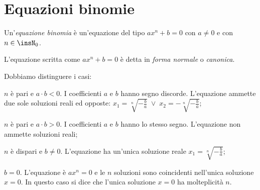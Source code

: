 \ovalbox{\risolvii \ref{ese:5.1}, \ref{ese:5.2}, \ref{ese:5.3}, \ref{ese:5.4}, \ref{ese:5.5}, \ref{ese:5.6}, \ref{ese:5.7}, \ref{ese:5.8}, \ref{ese:5.9}, \ref{ese:5.10}, \ref{ese:5.11}}

\section{Equazioni binomie}

\begin{definizione}
Un'\emph{equazione binomia} è un'equazione del tipo $ax^n+b=0$ con $a\neq 0$ e con $n\in \insN_0$.
\end{definizione}

L'equazione scritta come $ax^n+b=0$ è detta in \emph{forma normale} o \emph{canonica}.

Dobbiamo distinguere i casi:
\begin{itemize*}
\item $n$ è pari e $ a\cdot b< 0 $. I coefficienti $ a $ e $ b $ hanno segno discorde. L'equazione ammette due sole soluzioni reali ed opposte: $x_1=\sqrt[n]{-\frac b a}\;\vee\; x_2=-\sqrt[n]{-\frac b a}$;
\item $n$ è pari e $ a\cdot b> 0 $. I coefficienti $ a $ e $ b $ hanno lo stesso segno. L'equazione non ammette soluzioni reali;
\item $n$ è dispari e $ b\neq 0 $. L'equazione ha un'unica soluzione reale $x_1=\sqrt[n]{-\frac b a}$;
\item $b=0$. L'equazione è $ax^n=0$ e le $n$ soluzioni sono coincidenti nell'unica soluzione $x=0$. In questo caso si dice che l'unica soluzione $x=0$ ha molteplicità $n$.
\end{itemize*}
